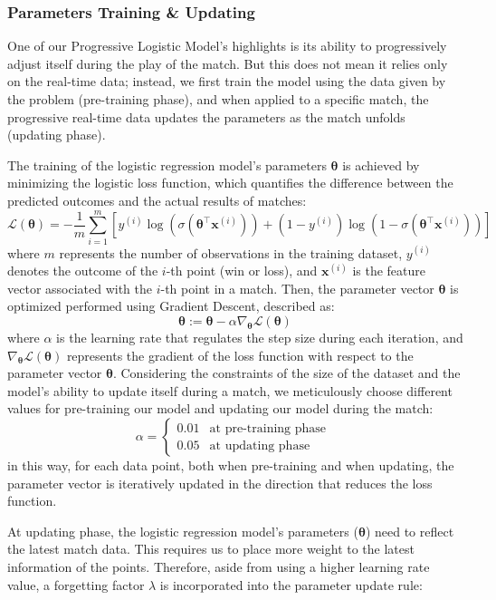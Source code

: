 \documentclass[12pt]{article}  %
\begin{document}
\subsubsection{Parameters Training \& Updating}
One of our Progressive Logistic Model's highlights is its ability to progressively adjust itself during the play of the match. But this does not mean it relies only on the real-time data; instead, we first train the model using the data given by the problem (pre-training phase), and when applied to a specific match, the progressive real-time data updates the parameters as the match unfolds (updating phase).

The training of the logistic regression model's parameters $\mathbf{\theta}$ is achieved by minimizing the logistic loss function, which quantifies the difference between the predicted outcomes and the actual results of matches:
\[
\mathcal{L}(\mathbf{\theta}) = -\frac{1}{m} \sum_{i=1}^{m} \left[ y^{(i)} \log(\sigma(\mathbf{\theta}^\top \mathbf{x}^{(i)})) + (1 - y^{(i)}) \log(1 - \sigma(\mathbf{\theta}^\top \mathbf{x}^{(i)})) \right]
\]
where \( m \) represents the number of observations in the training dataset, \( y^{(i)} \) denotes the outcome of the \( i \)-th point (win or loss), and \( \mathbf{x}^{(i)} \) is the feature vector associated with the \( i \)-th point in a match. Then, the parameter vector \( \mathbf{\theta} \) is optimized performed using Gradient Descent, described as:
\[
\mathbf{\theta} := \mathbf{\theta} - \alpha \nabla_{\mathbf{\theta}} \mathcal{L}(\mathbf{\theta})
\]
where \( \alpha \) is the learning rate that regulates the step size during each iteration, and \( \nabla_{\mathbf{\theta}} \mathcal{L}(\mathbf{\theta}) \) represents the gradient of the loss function with respect to the parameter vector \( \mathbf{\theta} \). Considering the constraints of the size of the dataset and the model's ability to update itself during a match, we meticulously choose different values for pre-training our model and updating our model during the match:
\[
\alpha = 
\begin{cases} 
	0.01 & \text{at pre-training phase } \\
	0.05 & \text{at updating phase } 
\end{cases}
\]
in this way, for each data point, both when pre-training and when updating, the parameter vector is iteratively updated in the direction that reduces the loss function.

At updating phase, the logistic regression model's parameters (\( \mathbf{\theta} \)) need to reflect the latest match data. This requires us to place more weight to the latest information of the points. Therefore, aside from using a higher learning rate value, a forgetting factor \( \lambda \) is incorporated into the parameter update rule:
\end{document}
